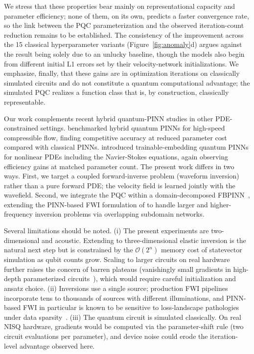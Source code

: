 \documentclass[11pt,a4paper]{article}
\begin{document}
We stress that these properties bear mainly on representational capacity and parameter efficiency; none of them, on its own, predicts a faster convergence rate, so the link between the PQC parameterization and the observed iteration-count reduction remains to be established. The consistency of the improvement across the 15 classical hyperparameter variants (Figure~\ref{fig:anomaly}d) argues against the result being solely due to an unlucky baseline, though the models also begin from different initial L1 errors set by their velocity-network initializations. We emphasize, finally, that these gains are in optimization iterations on classically simulated circuits and do not constitute a quantum computational advantage; the simulated PQC realizes a function class that is, by construction, classically representable.

Our work complements recent hybrid quantum-PINN studies in other PDE-constrained settings. \citet{LEONG2025106782} benchmarked hybrid quantum PINNs for high-speed compressible flow, finding competitive accuracy at reduced parameter cost compared with classical PINNs. \citet{Berger2025} introduced trainable-embedding quantum PINNs for nonlinear PDEs including the Navier-Stokes equations, again observing efficiency gains at matched parameter count. The present work differs in two ways. First, we target a coupled forward-inverse problem (waveform inversion) rather than a pure forward PDE; the velocity field is learned jointly with the wavefield. Second, we integrate the PQC within a domain-decomposed FBPINN~\citep{Moseley2023}, extending the PINN-based FWI formulation of \citet{rahst} to handle larger and higher-frequency inversion problems via overlapping subdomain networks.

Several limitations should be noted. (i) The present experiments are two-dimensional and acoustic. Extending to three-dimensional elastic inversion is the natural next step but is constrained by the $\mathcal{O}(2^n)$ memory cost of statevector simulation as qubit counts grow. Scaling to larger circuits on real hardware further raises the concern of barren plateaus (vanishingly small gradients in high-depth parameterized circuits~\citep{mcclean2018barren}), which would require careful initialization and ansatz choice. (ii) Inversions use a single source; production FWI pipelines incorporate tens to thousands of sources with different illuminations, and PINN-based FWI in particular is known to be sensitive to loss-landscape pathologies under data sparsity~\citep{krishnapriyan2021failure}. (iii) The quantum circuit is simulated classically. On real NISQ hardware, gradients would be computed via the parameter-shift rule (two circuit evaluations per parameter), and device noise could erode the iteration-level advantage observed here.
\end{document}
